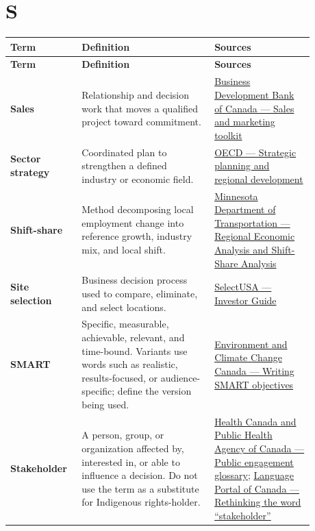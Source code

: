 \documentclass[11pt,letterpaper,oneside,openany]{book}
\begin{document}
\section[S]{S}
\begin{center}
\small
\setlength{\LTpre}{0.4em}
\setlength{\LTpost}{0.8em}
\begin{longtable}{>{\RaggedRight\arraybackslash}p{0.180\linewidth}>{\RaggedRight\arraybackslash}p{0.400\linewidth}>{\RaggedRight\arraybackslash}p{0.300\linewidth}}
\rowcolor{DeepNavy}
\color{white}\bfseries Term & \color{white}\bfseries Definition & \color{white}\bfseries Sources \\
\endfirsthead
\rowcolor{DeepNavy}
\color{white}\bfseries Term & \color{white}\bfseries Definition & \color{white}\bfseries Sources \\
\endhead
\textbf{Sales} & Relationship and decision work that moves a qualified project toward commitment. & \href{https://www.bdc.ca/en/articles-tools/entrepreneur-toolkit/templates-business-guides/sales-and-marketing-toolkit/sales-and-marketing-toolkit-download}{Business Development Bank of Canada --- Sales and marketing toolkit} \\
\textbf{Sector strategy} & Coordinated plan to strengthen a defined industry or economic field. & \href{https://www.oecd.org/en/topics/sub-issues/strategic-planning-and-regional-development.html}{OECD --- Strategic planning and regional development} \\
\textbf{Shift-share} & Method decomposing local employment change into reference growth, industry mix, and local shift. & \href{https://www.dot.mn.gov/ofrw/freight/PDF/d1plan/wp2.pdf}{Minnesota Department of Transportation --- Regional Economic Analysis and Shift-Share Analysis} \\
\textbf{Site selection} & Business decision process used to compare, eliminate, and select locations. & \href{https://www.trade.gov/selectusa-investor-guide}{SelectUSA --- Investor Guide} \\
\textbf{SMART} & Specific, measurable, achievable, relevant, and time-bound. Variants use words such as realistic, results-focused, or audience-specific; define the version being used. & \href{https://www.canada.ca/en/environment-climate-change/services/environmental-funding/tools-for-applying/writing-smart-objectives.html}{Environment and Climate Change Canada --- Writing SMART objectives} \\
\textbf{Stakeholder} & A person, group, or organization affected by, interested in, or able to influence a decision. Do not use the term as a substitute for Indigenous rights-holder. & \href{https://www.canada.ca/en/health-canada/services/publications/health-system-services/health-canada-public-health-agency-canada-guidelines-public-engagement/glossary-terms.html}{Health Canada and Public Health Agency of Canada --- Public engagement glossary}; \href{https://our-languages.canada.ca/en/blogue-blog/rethinking-the-word-stakeholder-eng}{Language Portal of Canada --- Rethinking the word ``stakeholder''} \\

\end{longtable}
\end{center}
\end{document}
